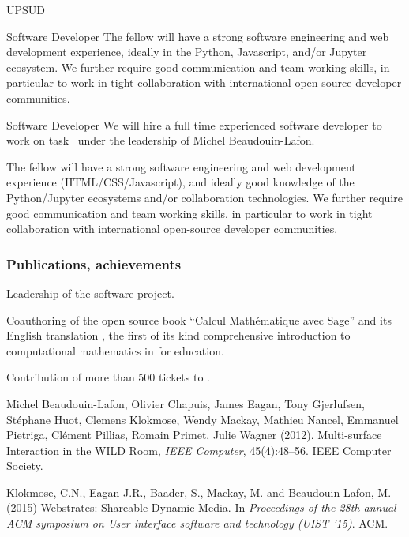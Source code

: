 \begin{sitedescription}{UPSUD}
\begin{participant}[type=res,PM=21]{Software Developer}
  The fellow will have a strong software engineering and web
  development experience, ideally in the Python, Javascript, and/or
  Jupyter ecosystem. We further require good communication and team
  working skills, in particular to work in tight collaboration with
  international open-source developer communities.
\end{participant}

\begin{participant}[type=res,PM=12]{Software Developer}
  We will hire a full time experienced software developer to work
  on task~ %
  under the leadership of Michel Beaudouin-Lafon.

  The fellow will have a strong software engineering and web
  development experience (HTML/CSS/Javascript), and ideally 
  good knowledge of the Python/Jupyter ecosystems
  and/or collaboration technologies. 
  We further require good communication and team
  working skills, in particular to work in tight collaboration with
  international open-source developer communities.
\end{participant}


\subsubsection*{Publications, achievements}

\begin{compactenum}
\item Leadership of the \SageCombinat software project.
\item Coauthoring of the open source book ``Calcul Mathématique avec
  Sage'' and its English translation , the first of its kind
  comprehensive introduction to computational mathematics in \Sage for
  education.
\item Contribution of more than 500 tickets to \Sage.
\item
Michel Beaudouin-Lafon, Olivier Chapuis, James Eagan, Tony Gjerlufsen, Stéphane Huot, Clemens Klokmose, Wendy Mackay, Mathieu Nancel, Emmanuel Pietriga, Clément Pillias, Romain Primet, Julie Wagner (2012). Multi-surface Interaction in the WILD Room, \emph{IEEE Computer}, 45(4):48–56. IEEE Computer Society.
\item
Klokmose, C.N., Eagan J.R., Baader, S., Mackay, M. and Beaudouin-Lafon, M. (2015) Webstrates: Shareable Dynamic Media. In \emph{Proceedings of the 28th annual ACM symposium on User interface software and technology (UIST ’15)}. ACM.
\end{compactenum}


\end{sitedescription}
